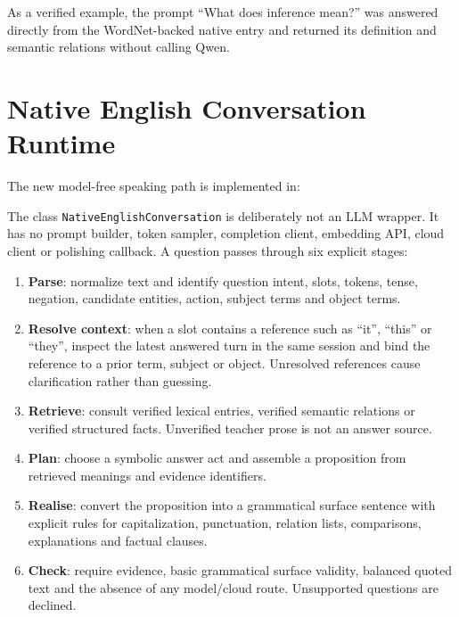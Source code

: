 \documentclass[11pt,a4paper]{article}
\begin{document}
As a verified example, the prompt ``What does inference mean?'' was answered directly from the
WordNet-backed native entry and returned its definition and semantic relations without calling
Qwen.

\section{Native English Conversation Runtime}

The new model-free speaking path is implemented in:

\begin{quote}
\end{quote}

The class \texttt{NativeEnglishConversation} is deliberately not an LLM wrapper. It has no
prompt builder, token sampler, completion client, embedding API, cloud client or polishing
callback. A question passes through six explicit stages:

\begin{enumerate}
  \item \textbf{Parse}: normalize text and identify question intent, slots, tokens, tense,
        negation, candidate entities, action, subject terms and object terms.
  \item \textbf{Resolve context}: when a slot contains a reference such as ``it'', ``this''
        or ``they'', inspect the latest answered turn in the same session and bind the
        reference to a prior term, subject or object. Unresolved references cause
        clarification rather than guessing.
  \item \textbf{Retrieve}: consult verified lexical entries, verified semantic relations or
        verified structured facts. Unverified teacher prose is not an answer source.
  \item \textbf{Plan}: choose a symbolic answer act and assemble a proposition from retrieved
        meanings and evidence identifiers.
  \item \textbf{Realise}: convert the proposition into a grammatical surface sentence with
        explicit rules for capitalization, punctuation, relation lists, comparisons,
        explanations and factual clauses.
  \item \textbf{Check}: require evidence, basic grammatical surface validity, balanced quoted
        text and the absence of any model/cloud route. Unsupported questions are declined.
\end{enumerate}
\end{document}
